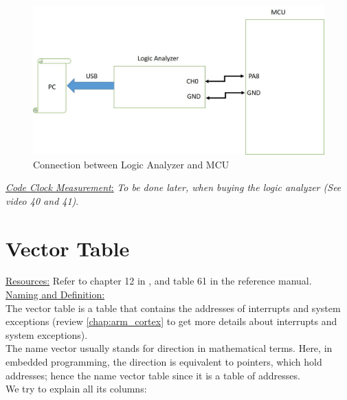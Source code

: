 \begin{figure}[h]
\centering
\includegraphics[scale=0.5]{Figures/driver_part_1/logic_analyzer_MCU_connection}
\caption{Connection between Logic Analyzer and MCU}
\label{fig:driver_part_1:logic_analyzer_MCU_connection}
\end{figure} 


 \underline{\textit{Code Clock Measurement}:} \textit{To be done later, when buying the logic analyzer (See video 40 and 41)}. 


\newpage

\section{Vector Table}

\underline{Resources:} Refer to chapter 12 in \cite{book_Embedded_systems_ARM_Cortex_M_YifengZhu} , and table 61 in the reference manual.\\

\underline{Naming and Definition:}\\

The vector table is a table that contains the addresses of interrupts and system exceptions (review \autoref{chap:arm_cortex} to get more details about interrupts and system exceptions).\\

The name vector usually stands for direction in mathematical terms. Here, in embedded programming, the direction is equivalent to pointers, which hold addresses; hence the name vector table since it is a table of addresses.\\ 

We try to explain all its columns:

